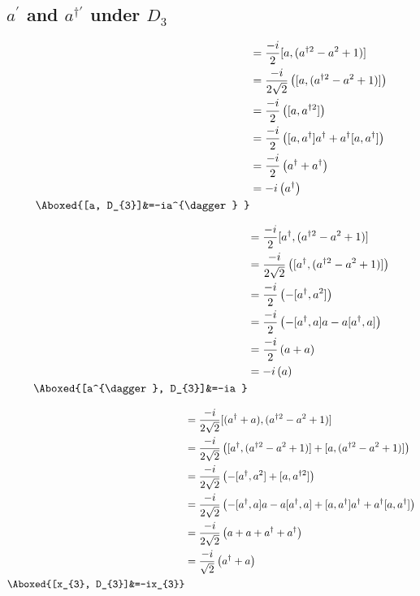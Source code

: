 \documentclass[]{article}
\numberwithin{equation}{section}
\begin{document}
{{\subsection{$a^{\prime}$ and $a^{\dagger\prime}$ under $D_{3}$}
\begin{align}
    [a, D_{3}]&=\frac{-i}{2}[a, (a^{\dagger 2} - a^2+1)]\\
    &=\frac{-i}{2\sqrt{2}}\left([a, (a^{\dagger 2} - a^2+1)]\right)\\
    &=\frac{-i}{2}\left([a, a^{\dagger 2} ]\right)\\
    &=\frac{-i}{2}\left([a, a^{\dagger } ]a^{\dagger }+a^{\dagger }[a, a^{\dagger } ]\right)\\
    &=\frac{-i}{2}\left(a^{\dagger }+a^{\dagger } \right)\\
    &=-i\left(a^{\dagger } \right)\\
    \Aboxed{[a, D_{3}]&=-ia^{\dagger } }
\end{align}

\begin{align}
    [a^{\dagger }, D_{3}]&=\frac{-i}{2}[a^{\dagger }, (a^{\dagger 2} - a^2+1)]\\
    &=\frac{-i}{2\sqrt{2}}\left([a^{\dagger }, (a^{\dagger 2} - a^2+1)]\right)\\
    &=\frac{-i}{2}\left(-[a^{\dagger}, a^2]\right)\\
    &=\frac{-i}{2}\left(-[a^{\dagger}, a]a-a[a^{\dagger}, a]\right)\\
    &=\frac{-i}{2}\left(a+a \right)\\
    &=-i\left(a\right)\\
    \Aboxed{[a^{\dagger}, D_{3}]&=-ia }
\end{align}

\begin{align}
    [x_{3}, D_{3}]&=\frac{-i}{2\sqrt{2}}[(a^{\dagger}+a), (a^{\dagger 2} - a^2+1)]\\
    &=\frac{-i}{2\sqrt{2}}\left([a^{\dagger}, (a^{\dagger 2} - a^2+1)]+[a, (a^{\dagger 2} - a^2+1)]\right)\\
    &=\frac{-i}{2\sqrt{2}}\left(-[a^{\dagger}, a^2]+[a, a^{\dagger 2} ]\right)\\
    &=\frac{-i}{2\sqrt{2}}\left(-[a^{\dagger}, a]a-a[a^{\dagger}, a]+[a, a^{\dagger } ]a^{\dagger }+a^{\dagger }[a, a^{\dagger } ]\right)\\
    &=\frac{-i}{2\sqrt{2}}\left(a+a+a^{\dagger}+a^{\dagger } \right)\\
    &=\frac{-i}{\sqrt{2}}\left(a^{\dagger } + a\right)\\
    \Aboxed{[x_{3}, D_{3}]&=-ix_{3}}
\end{align}

}}
\end{document}
